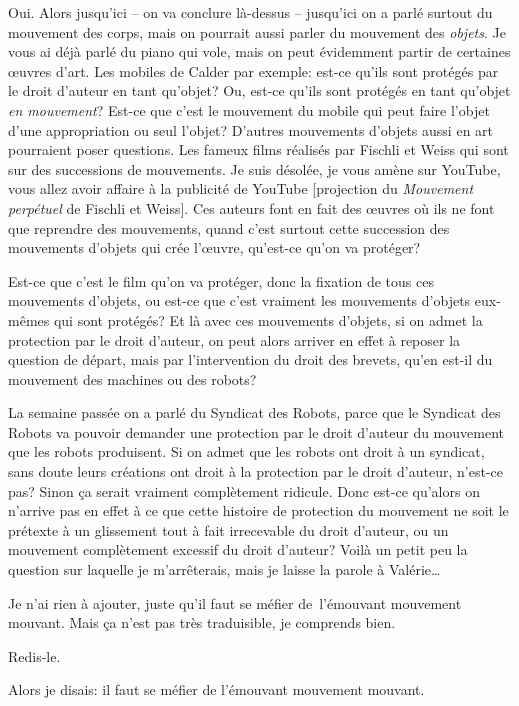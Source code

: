 {Oui. Alors jusqu'ici {--} on va conclure l\`a{}-dessus {--}
jusqu'ici on a parl\'e surtout du mouvement des corps, mais on pourrait
aussi parler du mouvement des {\em objets}. Je vous ai d\'ej\`a
parl\'e du piano qui vole, mais on peut \'evidemment partir de
certaines {\oe}uvres d'art. Les mobiles de Calder par exemple: est{}-ce
qu'ils sont prot\'eg\'es par le droit d'auteur en tant qu'objet? Ou,
est{}-ce qu'ils sont prot\'eg\'es en tant qu'objet {\em en
mouvement}? Est{}-ce que c'est le mouvement du mobile qui peut faire
l'objet d'une appropriation ou seul l'objet? D'autres mouvements
d'objets aussi en art pourraient poser questions. Les fameux films
r\'ealis\'es par Fischli et Weiss qui sont sur des successions de
mouvements. Je suis d\'esol\'ee, je vous am\`ene sur YouTube, vous
allez avoir affaire \`a la publicit\'e de YouTube [projection du
{\em Mouvement perp\'etuel} de Fischli et Weiss]. Ces auteurs font
en fait des {\oe}uvres o\`u ils ne font que reprendre des mouvements,
quand c'est surtout cette succession des mouvements d'objets qui cr\'ee
l'{\oe}uvre, qu'est{}-ce qu'on va prot\'eger?\par

Est{}-ce que c'est le film qu'on va prot\'eger, donc la fixation de tous
ces mouvements d'objets, ou est{}-ce que c'est vraiment les mouvements
d'objets eux{}-m\^emes qui sont prot\'eg\'es? Et l\`a avec ces
mouvements d'objets, si on admet la protection par le droit d'auteur,
on peut alors arriver en effet \`a reposer la question de d\'epart,
mais par l'intervention du droit des brevets, qu'en
est{}-il du mouvement des machines ou des robots?\par

La semaine pass\'ee on a parl\'e du Syndicat des Robots, parce que le
Syndicat des Robots va pouvoir demander une protection par le droit
d'auteur du mouvement que les robots produisent. Si on admet que les
robots ont droit \`a un syndicat, sans doute leurs cr\'eations ont
droit \`a la protection par le droit d'auteur, n'est{}-ce pas? Sinon
\c{c}a serait vraiment compl\`etement ridicule. Donc est{}-ce qu'alors
on n'arrive pas en effet \`a ce que cette histoire de protection du
mouvement ne soit le pr\'etexte \`a un glissement tout \`a fait
irrecevable du droit d'auteur, ou un mouvement compl\`etement excessif
du droit d'auteur? Voil\`a un petit peu la question sur laquelle je
m'arr\^eterais, mais je laisse la parole \`a Val\'erie{\dots}

Je n'ai rien \`a ajouter, juste qu'il faut se m\'efier
de~l'\'emouvant mouvement mouvant. Mais \c{c}a n'est pas tr\`es
traduisible, je comprends bien.\par

Redis{}-le.\par

Alors je disais: il faut se m\'efier de l'\'emouvant mouvement
mouvant.\par}

